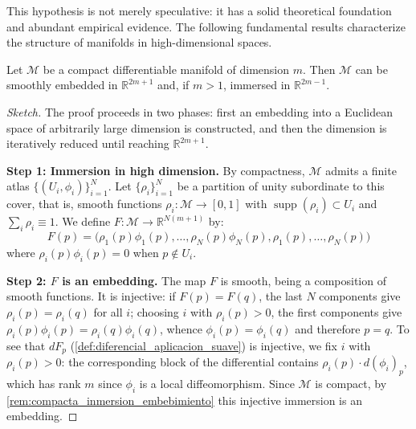 This hypothesis is not merely speculative: it has a solid theoretical foundation and abundant empirical evidence. The following fundamental results characterize the structure of manifolds in high-dimensional spaces.

\begin{theorem}\label{thm:whitney_embedding}
Let $\mathcal{M}$ be a compact differentiable manifold of dimension $m$. Then $\mathcal{M}$ can be smoothly embedded in $\mathbb{R}^{2m+1}$ and, if $m > 1$, immersed in $\mathbb{R}^{2m-1}$.
\end{theorem}

\begin{proof}[Sketch]
The proof proceeds in two phases: first an embedding into a Euclidean space of arbitrarily large dimension is constructed, and then the dimension is iteratively reduced until reaching $\mathbb{R}^{2m+1}$.

\textbf{Step 1: Immersion in high dimension.}
By compactness, $\mathcal{M}$ admits a finite atlas $\{(U_i, \phi_i)\}_{i=1}^N$. Let $\{\rho_i\}_{i=1}^N$ be a partition of unity subordinate to this cover, that is, smooth functions $\rho_i: \mathcal{M} \to [0,1]$ with $\operatorname{supp}(\rho_i) \subset U_i$ and $\sum_i \rho_i \equiv 1$. We define $F: \mathcal{M} \to \mathbb{R}^{N(m+1)}$ by:
\[
F(p) = \bigl(\rho_1(p)\phi_1(p), \ldots, \rho_N(p)\phi_N(p), \rho_1(p), \ldots, \rho_N(p)\bigr)
\]
where $\rho_i(p)\phi_i(p) = 0$ when $p \notin U_i$.

\textbf{Step 2: $F$ is an embedding.}
The map $F$ is smooth, being a composition of smooth functions. It is injective: if $F(p) = F(q)$, the last $N$ components give $\rho_i(p) = \rho_i(q)$ for all $i$; choosing $i$ with $\rho_i(p) > 0$, the first components give $\rho_i(p)\phi_i(p) = \rho_i(q)\phi_i(q)$, whence $\phi_i(p) = \phi_i(q)$ and therefore $p = q$. To see that $dF_p$ (\autoref{def:diferencial_aplicacion_suave}) is injective, we fix $i$ with $\rho_i(p) > 0$: the corresponding block of the differential contains $\rho_i(p) \cdot d(\phi_i)_p$, which has rank $m$ since $\phi_i$ is a local diffeomorphism. Since $\mathcal{M}$ is compact, by \autoref{rem:compacta_inmersion_embebimiento} this injective immersion is an embedding.


\end{proof}
